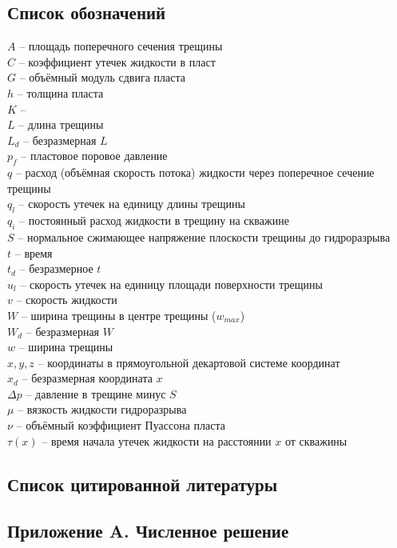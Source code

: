 \documentclass[a4paper, 11pt]{article}
\begin{document}
\subsection{Список обозначений}
\setlength{\parindent}{0pt}
$A$ -- площадь поперечного сечения трещины\\
$C$ -- коэффициент утечек жидкости в пласт\\
$G$ -- объёмный модуль сдвига пласта\\
$h$ -- толщина пласта\\
$K$ -- \\
$L$ -- длина трещины\\
$L_d$ -- безразмерная $L$\\
$p_f$ -- пластовое поровое давление\\
$q$ -- расход (объёмная скорость потока) жидкости через поперечное сечение трещины\\
$q_l$ -- скорость утечек на единицу длины трещины\\
$q_i$ -- постоянный расход жидкости в трещину на скважине\\
$S$ -- нормальное сжимающее напряжение плоскости трещины до гидроразрыва\\
$t$ -- время\\
$t_d$ -- безразмерное $t$\\
$u_l$ -- скорость утечек на единицу площади поверхности трещины\\
$v$ -- скорость жидкости\\
$W$ -- ширина трещины в центре трещины ($w_{max}$)\\
$W_d$ -- безразмерная $W$\\
$w$ -- ширина трещины\\
$x,y,z$ -- координаты в прямоугольной декартовой системе координат\\
$x_d$ -- безразмерная координата $x$\\
$\Delta p$ -- давление в трещине минус $S$\\
$\mu$ -- вязкость жидкости гидроразрыва\\
$\nu$ -- объёмный коэффициент Пуассона пласта\\
$\tau(x)$ -- время начала утечек жидкости на расстоянии $x$ от скважины
\setlength{\parindent}{20pt}

\subsection{Список цитированной литературы}

\subsection{Приложение A. Численное решение}
\end{document}
